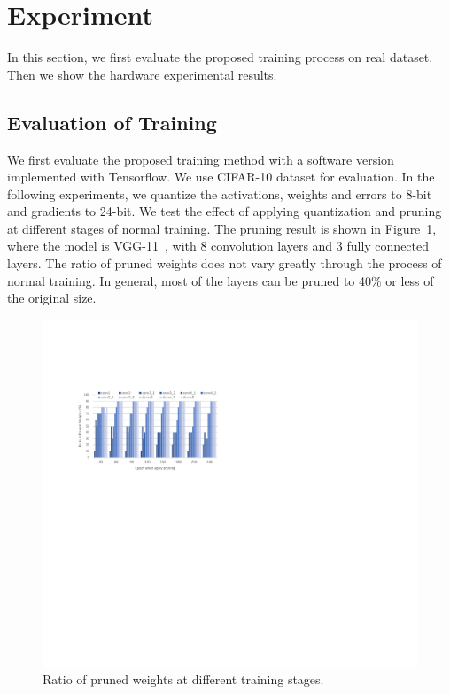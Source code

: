 \section{Experiment}\label{sec:experiment}
In this section, we first evaluate the proposed training process on real dataset. Then we show the hardware experimental results. 

\subsection{Evaluation of Training}
We first evaluate the proposed training method with a software version implemented with Tensorflow. We use CIFAR-10 dataset for evaluation. In the following experiments, we quantize the activations, weights and errors to 8-bit and gradients to 24-bit. We test the effect of applying quantization and pruning at different stages of normal training. The pruning result is shown in Figure~\ref{fig:prune_exp}, where the model is VGG-11~\cite{simonyan2014very}, with 8 convolution layers and 3 fully connected layers. The ratio of pruned weights does not vary greatly through the process of normal training. In general, most of the layers can be pruned to 40\% or less of the original size. 

\begin{figure}[tb]
  \centering
  \includegraphics[width=1.0\columnwidth]{figures/pruning_exp.pdf}
  \caption{Ratio of pruned weights at different training stages.}
  \label{fig:prune_exp}
\end{figure}

